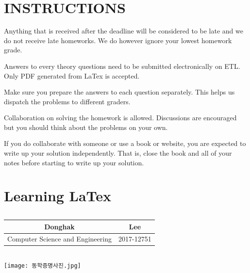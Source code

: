 \documentclass{article}
\begin{document}
\pagestyle{fancy}

\section*{INSTRUCTIONS}

\begin{itemize*}
\item Anything
  that is received after the deadline will be considered to be late and we do not receive late homeworks. We do however ignore your lowest homework grade. 
\item Answers to every theory questions need to be submitted
  electronically on ETL. Only PDF generated from LaTex is accepted.
\item Make sure you prepare the answers to each question
  separately. This helps us dispatch the problems to different graders.
\item Collaboration on solving the homework is allowed. Discussions
  are encouraged but you should think about the problems on your own. 
\item If you do collaborate with someone or use a book or website, you
  are expected to write up your solution independently.  That is,
  close the book and all of your notes before starting to write up
  your solution. 
\end{itemize*}


\section{Learning LaTex}

\subsection {}
\begin{center}
\begin{tabular}{|c|c|}
\hline
Donghak & Lee \\
\hline
Computer Science and Engineering & 2017-12751 \\
\hline
\end{tabular}
\end{center}

\subsection {}
\begin{center}
\texttt{[image: 동학증명사진.jpg]}
\end{center}
	
\end{document}
